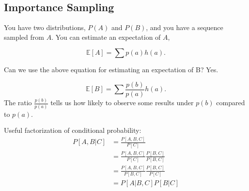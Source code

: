 \begin{appendices}
\section{Importance Sampling}
You have two distributions, $P(A)$ and $P(B)$, and you have a sequence sampled from $A$. You can estimate an expectation of $A$, 

$$\mathbb{E}[A] = \sum p(a)h(a).$$

Can we use the above equation for estimating an expectation of B? Yes.

$$\mathbb{E}[B] = \sum \frac{p(b)}{p(a)}h(a).$$
The ratio $\frac{p(b)}{p(a)}$ tells us how likely to observe some results under $p(b)$ compared to $p(a)$.



%
%
%
Useful factorization of conditional probability:
\begin{align}
P[A,B|C]&=\frac{P[A,B,C]}{P[C]} \\
&= \frac{P[A,B,C]}{P[C]} \frac{P[B,C]}{P[B,C]}\\
&= \frac{P[A,B,C]}{P[B,C]} \frac{P[B,C]}{P[C]}\\
&= P[A|B,C] P[B|C]
\end{align}



\end{appendices}
